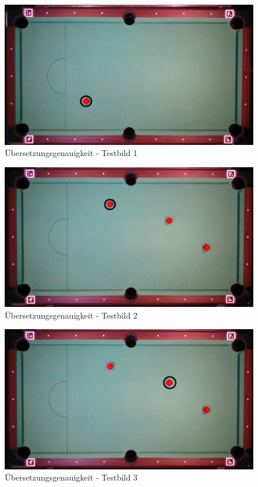 \begin{figure}[h!]
    \begin{center}
        \includegraphics[width=0.8\linewidth]{../common/07_appendix/resources/01_translation/00_translation_testbild_1.png}
    \end{center}
    \caption{Übersetzungsgenauigkeit - Testbild 1}
    \label{fig:uebersetzungsgenauigkeit:testbild:1}
\end{figure}
\begin{figure}[h!]
    \begin{center}
        \includegraphics[width=0.8\linewidth]{../common/07_appendix/resources/01_translation/01_translation_testbild_2.png}
    \end{center}
    \caption{Übersetzungsgenauigkeit - Testbild 2}
    \label{fig:uebersetzungsgenauigkeit:testbild:2}
\end{figure}
\begin{figure}[h!]
    \begin{center}
        \includegraphics[width=0.8\linewidth]{../common/07_appendix/resources/01_translation/02_translation_testbild_3.png}
    \end{center}
    \caption{Übersetzungsgenauigkeit - Testbild 3}
    \label{fig:uebersetzungsgenauigkeit:testbild:3}
\end{figure}
